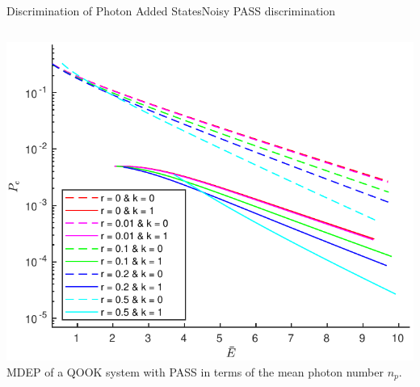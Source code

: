 \begin{frame}{Discrimination of Photon Added States}{Noisy PASS discrimination}
    \begin{columns}
        \begin{column}{0.5\linewidth}%
            \begin{center}
                \includegraphics[width=1\textwidth]{Pictures/fig3.6.pdf}\\
                \scriptsize{
                MDEP of a QOOK system with PASS in terms of the mean photon number $n_p$.
                }
            \end{center}
        \end{column}
        

\end{columns}
\end{frame}
